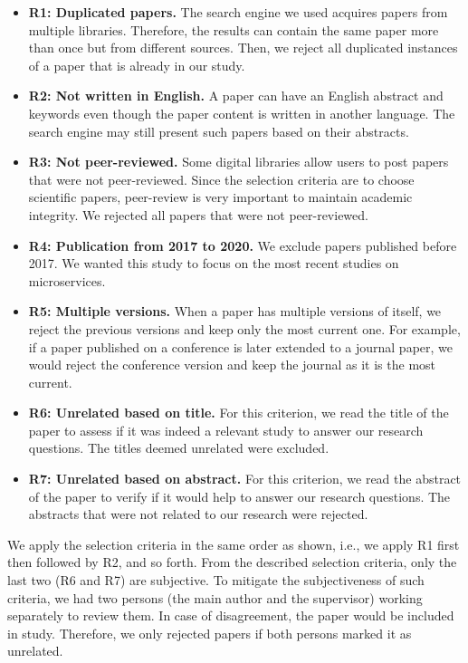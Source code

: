 \begin{itemize}
   \item \textbf{R1: Duplicated papers.} The search engine we used acquires papers from multiple libraries. Therefore, the results can contain the same paper more than once but from different sources. Then, we reject all duplicated instances of a paper that is already in our study.
   \item \textbf{R2: Not written in English.} A paper can have an English abstract and keywords even though the paper content is written in another language. The search engine may still present such papers based on their abstracts.
  \item \textbf{R3: Not peer-reviewed.} Some digital libraries allow users to post papers that were not peer-reviewed. Since the selection criteria are to choose scientific papers,  peer-review is very important to maintain academic integrity. We rejected all papers that were not peer-reviewed.
   \item \textbf{R4: Publication from 2017 to 2020.} 
We exclude papers published before 2017. We wanted this study to focus on the most recent studies on microservices.
  \item \textbf{R5: Multiple versions.} When a paper has multiple versions of itself, we reject the previous versions and keep only the most current one. For example, if a paper published on a conference is later extended to a journal paper, we would reject the conference version and keep the journal as it is the most current.
  \item \textbf{R6: Unrelated based on title.} For this criterion, we read the title of the paper to assess if it was indeed a relevant study to answer our research questions. The titles deemed unrelated were excluded.
  \item \textbf{R7: Unrelated based on abstract.} For this criterion, we read the abstract of the paper to verify if it would help to answer our research questions. The abstracts that were not related to our research were rejected.  
\end{itemize}


We apply the selection criteria in the same order as shown, i.e., we apply R1 first then followed by R2, and so forth.
From the described selection criteria, only the last two (R6 and R7) are subjective. To mitigate the subjectiveness of such criteria, we had two persons (the main author and the supervisor) working separately to review them. In case of disagreement, the paper would be included in study. Therefore, we only rejected papers if both persons marked it as unrelated.


